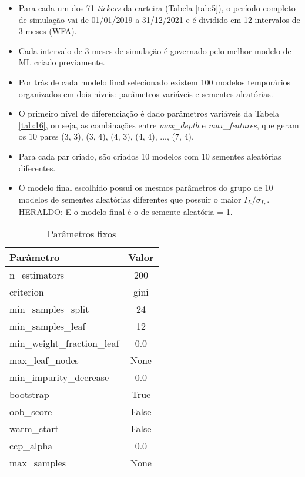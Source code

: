 \begin{itemize}
    \item Para cada um dos 71 \textit{tickers} da carteira (Tabela \ref{tab:5}), o período completo de simulação vai de 01/01/2019 a 31/12/2021 e é dividido em 12 intervalos de 3 meses (WFA).

    \item Cada intervalo de 3 meses de simulação é governado pelo melhor modelo de ML criado previamente.

    \item Por trás de cada modelo final selecionado existem 100 modelos temporários organizados em dois níveis: parâmetros variáveis e sementes aleatórias.

    \item O primeiro nível de diferenciação é dado parâmetros variáveis da Tabela \ref{tab:16}, ou seja, as combinações entre \textit{max\_depth} e \textit{max\_features}, que geram os 10 pares (3, 3), (3, 4), (4, 3), (4, 4), ..., (7, 4).

    \item Para cada par criado, são criados 10 modelos com 10 sementes aleatórias diferentes.

    \item O modelo final escolhido possui os mesmos parâmetros do grupo de 10 modelos de sementes aleatórias diferentes que possuir o maior \begin{math} I_L / \sigma_{I_L} \end{math}. \color{red} HERALDO: E o modelo final é o de semente aleatória = 1. \color{black}
\end{itemize}

\begin{table}[!htb]
    \begin{center}
        \begin{tabular}{ l|c }
            Parâmetro & Valor \\
            \hline
            n\_estimators & 200 \\
            criterion & gini \\
            min\_samples\_split & 24 \\
            min\_samples\_leaf & 12 \\
            min\_weight\_fraction\_leaf & 0.0 \\
            max\_leaf\_nodes & None \\
            min\_impurity\_decrease & 0.0 \\
            bootstrap & True \\
            oob\_score & False \\
            warm\_start & False \\
            ccp\_alpha & 0.0 \\
            max\_samples & None \\
        \end{tabular}
        \caption{Parâmetros fixos}
        \label{tab:15}
    \end{center}
\end{table}

